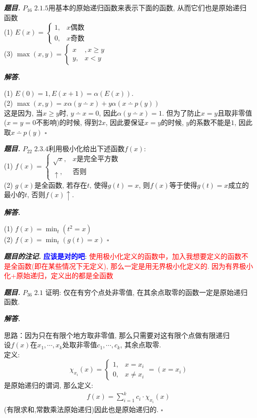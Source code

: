 \documentclass[10pt, a4paper, oneside]{ctexart}
\newenvironment{problem}{\begin{framed}\par\noindent\textbf{\textit{题目. }}}{\end{framed}\par}
\newenvironment{solution}{%
  \par\noindent\textbf{\textit{解答. }}\ignorespaces
}{%
  \hfill\ensuremath{\square}\par
}
\newenvironment{note}{\par\noindent\textbf{\textit{题目的注记. }}\ignorespaces}{\par}
\begin{document}
\begin{problem}
$P_{16}\; 2.1.5$用基本的原始递归函数来表示下面的函数, 从而它们也是原始递归函数\\
(1) $E(x)=\begin{cases}
    1, &x\text{偶数}\\
    0, &x\text{奇数}
\end{cases}$\\
(3) $\max(x,y)=\begin{cases}
    x&,x\geq y\\
    y,&x<y
\end{cases}$
\end{problem}
\begin{solution}
(1) $E(0)=1, E(x+1)=\alpha(E(x))$.\\
(2) $\max(x,y)=x\alpha(y\dotminus x)+y\alpha(x \dotminus p(y))$\\
这是因为, 当$x\geq y$时, $y\dotminus x=0$, 因此$\alpha(y\dotminus x)=1$. 但为了防止$x=y$且取非零值($x=y=0$不影响)的时候, 得到$2x$, 因此要保证$x=y$的时候, $y$的系数不能是$1$, 因此取$x\dotminus p(y)$ 
\end{solution}

\begin{problem}
$P_{22}\;2.3.4$利用极小化给出下述函数$f(x)$:\\
(1) $f(x)=\begin{cases}
    \sqrt{x}, &x\text{是完全平方数}\\
    \uparrow, &\text{否则}
\end{cases}$\\
(2) $g(x)$是全函数, 若存在$t$, 使得$g(t)=x$, 则$f(x)$等于使得$g(t)=x$成立的最小的$t$, 否则$f(x)\uparrow$.
\end{problem}
\begin{solution}
(1) $f(x)=\min_{t}(t^2=x)$\\
(2) $f(x)=\min_{t}(g(t)=x)$
\end{solution}
\begin{note}
\textbf{\textcolor{blue}{应该是对的吧}}: \textcolor{red}{使用极小化定义的函数中，加入我想要定义的函数不是全函数(即在某些情况下无定义), 那么一定是用无界极小化定义的. 因为有界极小化+原始递归，定义出的都是全函数}
\end{note}

\begin{problem}
$P_{36}\; 2.1$ 证明: 仅在有穷个点处非零值, 在其余点取零的函数一定是原始递归函数.
\end{problem}
\begin{solution}
 思路：因为只在有限个地方取非零值, 那么只需要对这有限个点做有限递归\\
设$f(x)$在$x_1,\cdots,x_k$处取非零值$c_1,\cdots,c_k$, 其余点取零.\\
定义:
$$\chi_{x_i}(x)=\begin{cases}
    1,&x=x_i\\
    0,&x\neq x_i
\end{cases}=(x=x_i)$$
是原始递归的谓词, 那么定义:
\begin{align*}
    f(x)=\sum_{i=1}^{k}c_i\cdot\chi_{x_i}(x)
\end{align*}
(有限求和,常数乘法原始递归)因此也是原始递归的.
\end{solution}
\end{document}
